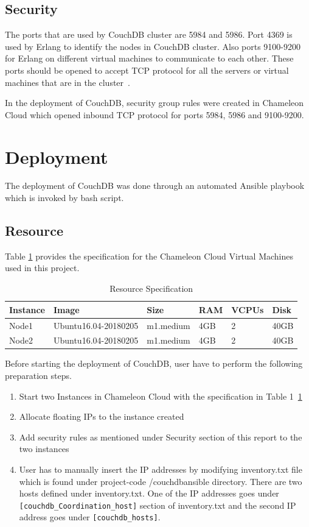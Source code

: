 \subsection{Security}
The ports that are used by CouchDB cluster are 5984 and 5986. Port
4369 is used by Erlang to identify the nodes in CouchDB cluster. Also
ports 9100-9200 for Erlang on different virtual machines to communicate to each
other. These ports should be opened to accept TCP protocol for all the
servers or virtual machines that are in the
cluster~\cite{www-CouchdbSetup}. 

In the deployment of CouchDB, security group rules were
created in Chameleon Cloud which opened inbound TCP protocol for ports
5984, 5986 and 9100-9200.


\section{Deployment}
The deployment of CouchDB  was done through an automated Ansible
playbook which is invoked by bash script.
\subsection{Resource}
Table \ref{t:resource-specification} provides the specification for
the Chameleon Cloud Virtual Machines used in this project.

\begin{table}[]
\centering
\caption{Resource Specification}
\label{t:resource-specification}
\begin{tabular}{|l|l|l|l|l|l|}
\hline
\textbf{Instance} & \textbf{Image}       & \textbf{Size} & \textbf{RAM} & \textbf{VCPUs} & \textbf{Disk} \\ \hline
Node1             & Ubuntu16.04-20180205 & m1.medium     & 4GB          & 2              & 40GB          \\ \hline
Node2             & Ubuntu16.04-20180205 & m1.medium     & 4GB          & 2              & 40GB          \\ \hline
\end{tabular}
\end{table}

Before starting the deployment of CouchDB, user have to perform the
following preparation steps.
\begin{enumerate}
  \item Start two Instances in Chameleon Cloud with the specification
    in Table 1~\ref{t:resource-specification}
   \item  Allocate floating IPs to the instance created
    \item Add  security rules as mentioned under Security section
      of this report to the two instances 
    \item  User has to manually insert the IP addresses by modifying
      inventory.txt file which is found under project-code
      /couchdbansible directory. There are two hosts 
      defined under inventory.txt. One of the IP addresses
      goes under \verb|[couchdb_Coordination_host]| section of inventory.txt
      and the second IP address goes under \verb|[couchdb_hosts]|.
\end{enumerate}

